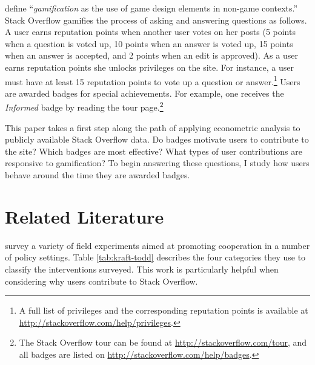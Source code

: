 \documentclass[conference]{IEEEtran}
\newcommand{\1}{\mathds{1}}
\begin{document}
\citet{Deterding2011} define ``\textit{gamification} as the use of game design elements in non-game contexts.'' Stack Overflow gamifies the process of asking and answering questions as follows. A user earns reputation points when another user votes on her posts (5 points when a question is voted up, 10 points when an answer is voted up, 15 points when an answer is accepted, and 2 points when an edit is approved). As a user earns reputation points she unlocks privileges on the site. For instance, a user must have at least 15 reputation points to vote up a question or answer.\footnote{A full list of privileges and the corresponding reputation points is available at \url{http://stackoverflow.com/help/privileges}.} Users are awarded badges for special achievements. For example, one receives the \textit{Informed} badge by reading the tour page.\footnote{The Stack Overflow tour can be found at \url{http://stackoverflow.com/tour}, and all badges are listed on \url{http://stackoverflow.com/help/badges}.}

This paper takes a first step along the path of applying econometric analysis to publicly available Stack Overflow data. Do badges motivate users to contribute to the site? Which badges are most effective? What types of user contributions are responsive to gamification? To begin answering these questions, I study how users behave around the time they are awarded badges.

\section{Related Literature}

\citet{Kraft-Todd} survey a variety of field experiments aimed at
promoting cooperation in a number of policy settings. Table
\ref{tab:kraft-todd} describes the four categories they use to
classify the interventions surveyed. This work is particularly helpful
when considering why users contribute to Stack Overflow.
\end{document}

